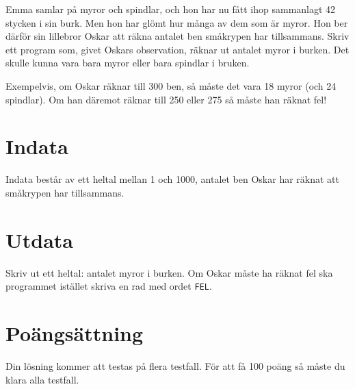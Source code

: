 
Emma samlar på myror och spindlar, och hon har nu fått ihop sammanlagt 42 stycken i sin burk. Men hon har glömt hur många av dem som är myror. Hon ber därför sin lillebror Oskar att räkna antalet ben småkrypen har tillsammans. Skriv ett program som, givet Oskars observation, räknar ut antalet myror i burken. Det skulle kunna vara bara myror eller bara spindlar i bruken.

Exempelvis, om Oskar räknar till 300 ben, så måste det vara 18 myror (och 24 spindlar). Om han däremot räknar till 250 eller 275 så måste han räknat fel!

\section*{Indata}
Indata består av ett heltal mellan 1 och 1000, antalet ben Oskar har räknat att småkrypen har tillsammans.

\section*{Utdata}
Skriv ut ett heltal: antalet myror i burken. Om Oskar måste ha räknat fel ska programmet istället skriva en rad med ordet \texttt{FEL}.

\section*{Poängsättning}
Din lösning kommer att testas på flera testfall. För att få 100 poäng så måste du klara alla testfall.

